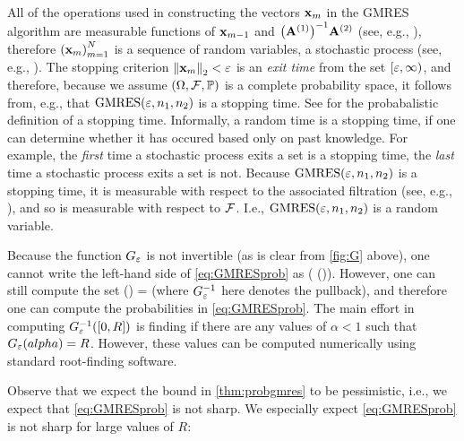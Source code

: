 All of the operations used in constructing the vectors $\mathbf{x}_{m}$ in the GMRES algorithm are measurable functions of $\mathbf{x}_{m-1}$ and $\AmatoI\Amatt$ (see, e.g., \cite[Algorithms 11.4.2 and 5.1.3]{GoVa:13}), therefore $\mleft(\bxm\mright)_{m=1}^N$ is a sequence of random variables, a stochastic process (see, e.g., \cite[Definition 2.1.4]{Ok:13}). The stopping criterion $\Nt{\bxm} < \eps$ is an \emph{exit time} from the set $\mleft[\eps,\infty\mright)$, and therefore, because we assume $\OFP$ is a complete probability space, it follows from, e.g.,  \cite[Example 7.2.2]{Ok:13} that $\GMRES{\eps}{\no}{\nt}$ is a stopping time. See \cite[Definition 7.2.1]{Ok:13} for the probabalistic definition of a stopping time. Informally, a random time is a stopping time, if one can determine whether it has occured based only on past knowledge. For example, the \emph{first} time a stochastic process exits a set is a stopping time, the \emph{last} time a stochastic process exits a set is not. Because $\GMRES{\eps}{\no}{\nt}$ is a stopping time, it is measurable with respect to the associated filtration (see, e.g., \cite[Definition 3.2.2]{Ok:13}), and so is measurable with respect to $\mathcal F$. I.e., $\GMRES{\eps}{\no}{\nt}$ is a random variable.
\ere

\label{rem:computable}
Because the function $G_{\varepsilon}$ is not invertible (as is clear from \cref{fig:G} above), one cannot write the left-hand side of \cref{eq:GMRESprob} as
\beqs
\PP\mleft(\NLiDRRR{\nso-\nst} \leq \GfnnameI\mleft(\mleft[0,R\mright]\mright)\mright).
\eeqs
However, one can still compute the set
\beqs
\GfnnameI\mleft(\mleft[0,R\mright]\mright) = \set{\alpha \st \Gfn{\alpha} \in \mleft[0,R\mright]}
\eeqs
(where $G_{\varepsilon}^{-1}$ here denotes the pullback), and therefore one can compute the probabilities in \cref{eq:GMRESprob}. The main effort in computing $\GfnI{\mleft[0,R\mright]}$ is finding if there are any values of $\alpha < 1$ such that $\Gfn{alpha} = R$. However, these values can be computed numerically using standard root-finding software.
\ere

\label{rem:pessimistic}
Observe that we expect the bound in \cref{thm:probgmres} to be pessimistic, i.e., we expect that \cref{eq:GMRESprob} is not sharp. We especially expect \cref{eq:GMRESprob} is not sharp for large values of $R:$

